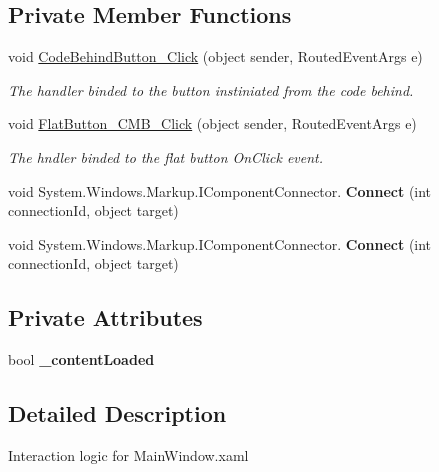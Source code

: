 \subsection*{Private Member Functions}
\begin{DoxyCompactItemize}
\item 
void \mbox{\hyperlink{class_flat_button_example_1_1_main_window_a9f921685d76dd83900884a1633a8ac31}{Code\+Behind\+Button\+\_\+\+Click}} (object sender, Routed\+Event\+Args e)
\begin{DoxyCompactList}\small\item\em The handler binded to the button instiniated from the code behind. \end{DoxyCompactList}\item 
void \mbox{\hyperlink{class_flat_button_example_1_1_main_window_a9e795fb202bd24fe55b5b36afbd15bd7}{Flat\+Button\+\_\+\+C\+M\+B\+\_\+\+Click}} (object sender, Routed\+Event\+Args e)
\begin{DoxyCompactList}\small\item\em The hndler binded to the flat button On\+Click event. \end{DoxyCompactList}\item 
\mbox{\label{class_flat_button_example_1_1_main_window_a1652d9cdbca88c7e540f866ba990472b}} 
void System.\+Windows.\+Markup.\+I\+Component\+Connector. {\bfseries Connect} (int connection\+Id, object target)
\item 
\mbox{\label{class_flat_button_example_1_1_main_window_a1652d9cdbca88c7e540f866ba990472b}} 
void System.\+Windows.\+Markup.\+I\+Component\+Connector. {\bfseries Connect} (int connection\+Id, object target)
\end{DoxyCompactItemize}
\subsection*{Private Attributes}
\begin{DoxyCompactItemize}
\item 
\mbox{\label{class_flat_button_example_1_1_main_window_a3a7cb743ff78d23eeac0145289b2946b}} 
bool {\bfseries \+\_\+content\+Loaded}
\end{DoxyCompactItemize}


\subsection{Detailed Description}
Interaction logic for Main\+Window.\+xaml 

